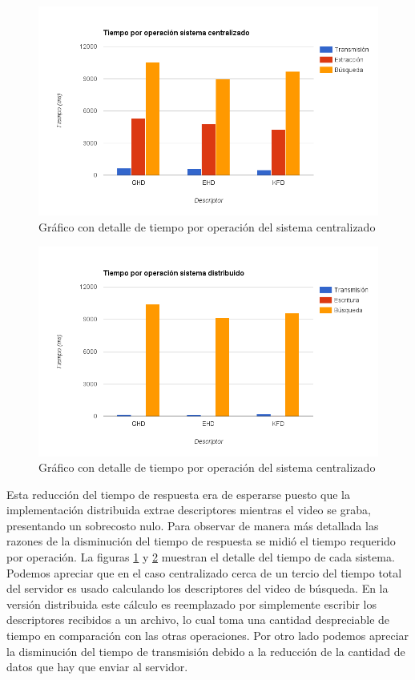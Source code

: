 	\begin{figure}[!h]
		\centering
		\includegraphics[width=\textwidth]{imagenes/cap5/resultados_tiempo_detalle_centralizado.png}
		\caption{Gráfico con detalle de tiempo por operación del sistema centralizado}
		\label{resultados_tiempo_detalle_centralizado}
	\end{figure}
	
	\begin{figure}[!h]
		\centering
		\includegraphics[width=\textwidth]{imagenes/cap5/resultados_tiempo_detalle_distribuido.png}
		\caption{Gráfico con detalle de tiempo por operación del sistema centralizado}
		\label{resultados_tiempo_detalle_distribuido}
	\end{figure}
	
Esta reducción del tiempo de respuesta era de esperarse puesto que la implementación distribuida extrae descriptores mientras el video se graba, presentando un sobrecosto nulo. Para observar de manera más detallada las razones de la disminución del tiempo de respuesta se midió el tiempo requerido por operación. La figuras \ref{resultados_tiempo_detalle_centralizado} y \ref{resultados_tiempo_detalle_distribuido} muestran el detalle del tiempo de cada sistema. Podemos apreciar que en el caso centralizado cerca de un tercio del tiempo total del servidor es usado calculando los descriptores del video de búsqueda. En la versión distribuida este cálculo es reemplazado por simplemente escribir los descriptores recibidos a un archivo, lo cual toma una cantidad despreciable de tiempo en comparación con las otras operaciones. Por otro lado podemos apreciar la disminución del tiempo de transmisión debido a la reducción de la cantidad de datos que hay que enviar al servidor.

